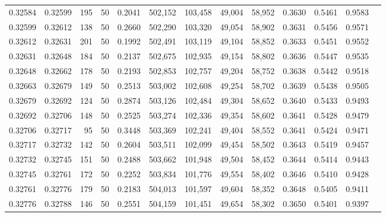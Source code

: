 \begin{tabular}{rrrrrrrrrrrrr}
0.32584 & 0.32599 &   195 &  50 &                                     0.2041 & 502,152 & 103,458 &  49,004 &  58,952 & 0.3630 & 0.5461 & 0.9583 \\
0.32599 & 0.32612 &   138 &  50 &                                     0.2660 & 502,290 & 103,320 &  49,054 &  58,902 & 0.3631 & 0.5456 & 0.9571 \\
0.32612 & 0.32631 &   201 &  50 &                                     0.1992 & 502,491 & 103,119 &  49,104 &  58,852 & 0.3633 & 0.5451 & 0.9552 \\
0.32631 & 0.32648 &   184 &  50 &                                     0.2137 & 502,675 & 102,935 &  49,154 &  58,802 & 0.3636 & 0.5447 & 0.9535 \\
0.32648 & 0.32662 &   178 &  50 &                                     0.2193 & 502,853 & 102,757 &  49,204 &  58,752 & 0.3638 & 0.5442 & 0.9518 \\
0.32663 & 0.32679 &   149 &  50 &                                     0.2513 & 503,002 & 102,608 &  49,254 &  58,702 & 0.3639 & 0.5438 & 0.9505 \\
0.32679 & 0.32692 &   124 &  50 &                                     0.2874 & 503,126 & 102,484 &  49,304 &  58,652 & 0.3640 & 0.5433 & 0.9493 \\
0.32692 & 0.32706 &   148 &  50 &                                     0.2525 & 503,274 & 102,336 &  49,354 &  58,602 & 0.3641 & 0.5428 & 0.9479 \\
0.32706 & 0.32717 &    95 &  50 &                                     0.3448 & 503,369 & 102,241 &  49,404 &  58,552 & 0.3641 & 0.5424 & 0.9471 \\
0.32717 & 0.32732 &   142 &  50 &                                     0.2604 & 503,511 & 102,099 &  49,454 &  58,502 & 0.3643 & 0.5419 & 0.9457 \\
0.32732 & 0.32745 &   151 &  50 &                                     0.2488 & 503,662 & 101,948 &  49,504 &  58,452 & 0.3644 & 0.5414 & 0.9443 \\
0.32745 & 0.32761 &   172 &  50 &                                     0.2252 & 503,834 & 101,776 &  49,554 &  58,402 & 0.3646 & 0.5410 & 0.9428 \\
0.32761 & 0.32776 &   179 &  50 &                                     0.2183 & 504,013 & 101,597 &  49,604 &  58,352 & 0.3648 & 0.5405 & 0.9411 \\
0.32776 & 0.32788 &   146 &  50 &                                     0.2551 & 504,159 & 101,451 &  49,654 &  58,302 & 0.3650 & 0.5401 & 0.9397 \\

\end{tabular}
